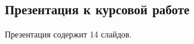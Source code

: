 \begin{appendices}
	\chapter{}
	\section*{Презентация к курсовой работе}
	Презентация содержит 14 слайдов.
\end{appendices}